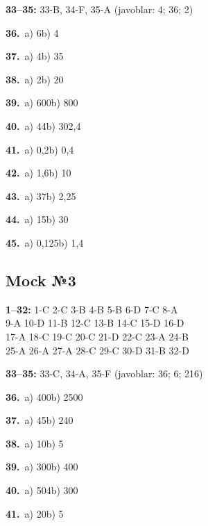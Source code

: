\documentclass[11pt,a4paper]{article}
\begin{document}
\noindent\textbf{33–35:} 33-B, 34-F, 35-A \quad (javoblar: 4; 36; 2)\par
\noindent\textbf{36.}\ a) 6\quad b) 4\par
\noindent\textbf{37.}\ a) 4\quad b) 35\par
\noindent\textbf{38.}\ a) 2\quad b) 20\par
\noindent\textbf{39.}\ a) 600\quad b) 800\par
\noindent\textbf{40.}\ a) 44\quad b) 302,4\par
\noindent\textbf{41.}\ a) 0,2\quad b) 0,4\par
\noindent\textbf{42.}\ a) 1,6\quad b) 10\par
\noindent\textbf{43.}\ a) 37\quad b) 2,25\par
\noindent\textbf{44.}\ a) 15\quad b) 30\par
\noindent\textbf{45.}\ a) 0,125\quad b) 1,4\par
{}\par\bigskip
{}\subsection*{Mock №3}
\noindent\textbf{1–32:} 1-C 2-C 3-B 4-B 5-B 6-D 7-C 8-A\\ 9-A 10-D 11-B 12-C 13-B 14-C 15-D 16-D\\ 17-A 18-C 19-C 20-C 21-D 22-C 23-A 24-B\\ 25-A 26-A 27-A 28-C 29-C 30-D 31-B 32-D\par
\noindent\textbf{33–35:} 33-C, 34-A, 35-F \quad (javoblar: 36; 6; 216)\par
\noindent\textbf{36.}\ a) 400\quad b) 2500\par
\noindent\textbf{37.}\ a) 45\quad b) 240\par
\noindent\textbf{38.}\ a) 10\quad b) 5\par
\noindent\textbf{39.}\ a) 300\quad b) 400\par
\noindent\textbf{40.}\ a) 504\quad b) 300\par
\noindent\textbf{41.}\ a) 20\quad b) 5\par
\end{document}
